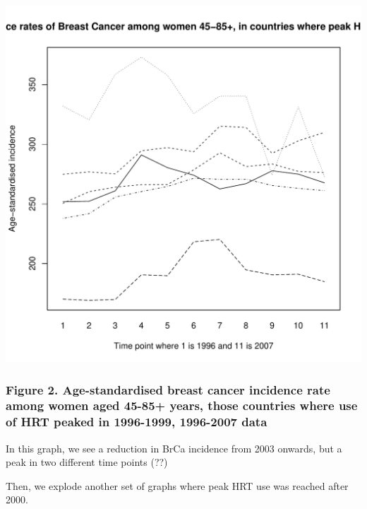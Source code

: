 \documentclass{article}\usepackage[]{graphicx}\usepackage[]{color}
\makeatletter
\def\maxwidth{ %
  \ifdim\Gin@nat@width>\linewidth
    \linewidth
  \else
    \Gin@nat@width
  \fi
}
\newenvironment{knitrout}{}{} %
\makeatother
\begin{document}
\begin{knitrout}
\color{fgcolor}
\includegraphics[width=\maxwidth]{figure/sphagettipre2k-1} 

\end{knitrout}

\subsubsection*{Figure 2. Age-standardised breast cancer incidence rate among women aged 45-85+ years, those countries where use of HRT peaked in 1996-1999, 1996-2007 data}

In this graph, we see a reduction in BrCa incidence from 2003 onwards, but a peak in two different time points (??)

Then, we explode another set of graphs where peak HRT use was reached after 2000.
\end{document}
